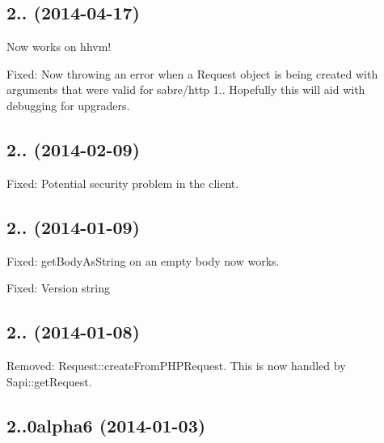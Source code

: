 \subsection*{2.. (2014-\/04-\/17) }


\begin{DoxyItemize}
\item Now works on hhvm!
\item Fixed\+: Now throwing an error when a Request object is being created with arguments that were valid for sabre/http 1.. Hopefully this will aid with debugging for upgraders.
\end{DoxyItemize}

\subsection*{2.. (2014-\/02-\/09) }


\begin{DoxyItemize}
\item Fixed\+: Potential security problem in the client.
\end{DoxyItemize}

\subsection*{2.. (2014-\/01-\/09) }


\begin{DoxyItemize}
\item Fixed\+: get\+Body\+As\+String on an empty body now works.
\item Fixed\+: Version string
\end{DoxyItemize}

\subsection*{2.. (2014-\/01-\/08) }


\begin{DoxyItemize}
\item Removed\+: Request\+::create\+From\+P\+H\+P\+Request. This is now handled by Sapi\+::get\+Request.
\end{DoxyItemize}

\subsection*{2..\+0alpha6 (2014-\/01-\/03) }


